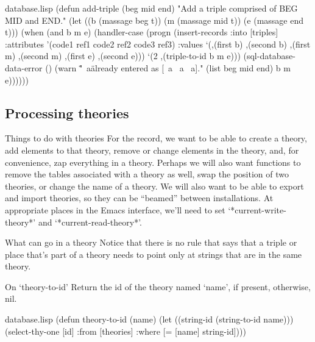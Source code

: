 \begin{common}{database.lisp}
(defun add-triple (beg mid end)
  "Add a triple comprised of BEG MID and END."
  (let ((b (massage beg t))
        (m (massage mid t))
        (e (massage end t)))
    (when (and b m e)
      (handler-case
       (progn
         (insert-records
          :into [triples] :attributes '(code1 ref1
                                        code2 ref2
                                        code3 ref3)
          :values `(,(first b) ,(second b)
                    ,(first m) ,(second m)
                    ,(first e) ,(second e)))
         `(2 ,(triple-to-id b m e)))
       (sql-database-data-error ()
         (warn "\"~a\" already entered as [~a ~a ~a]."
               (list beg mid end) b m e))))))
\end{common}

\subsection*{Processing theories} \label{processing-theories}

\begin{notate}{Things to do with theories}
For the record, we want to be able to create a theory, add
elements to that theory, remove or change elements in the
theory, and, for convenience, zap everything in a theory.
Perhaps we will also want functions to remove the tables
associated with a theory as well, swap the position of two
theories, or change the name of a theory.  We will also
want to be able to export and import theories, so they can
be ``beamed'' between installations.  At appropriate
places in the Emacs interface, we'll need to set
`*current-write-theory*' and `*current-read-theory*'.
\end{notate}

\begin{notate}{What can go in a theory} \label{what-can-go-in}
Notice that there is no rule that says that a triple or
place that's part of a theory needs to point only at
strings that are in the same theory.
\end{notate}

\begin{notate}{On `theory-to-id'}
Return the id of the theory named `name', if present,
otherwise, nil.
\end{notate}

\begin{common}{database.lisp}
(defun theory-to-id (name)
  (let ((string-id (string-to-id name)))
    (select-thy-one [id]
                    :from [theories]
                    :where [= [name] string-id])))
\end{common}

